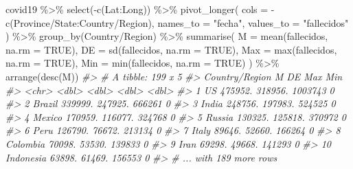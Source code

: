 \documentclass[
]{book}
\newenvironment{Shaded}{\begin{snugshade}}{\end{snugshade}}
\newcommand{\AttributeTok}[1]{\textcolor[rgb]{0.77,0.63,0.00}{#1}}
\newcommand{\CommentTok}[1]{\textcolor[rgb]{0.56,0.35,0.01}{\textit{#1}}}
\newcommand{\ConstantTok}[1]{\textcolor[rgb]{0.00,0.00,0.00}{#1}}
\newcommand{\FunctionTok}[1]{\textcolor[rgb]{0.00,0.00,0.00}{#1}}
\newcommand{\NormalTok}[1]{#1}
\newcommand{\SpecialCharTok}[1]{\textcolor[rgb]{0.00,0.00,0.00}{#1}}
\newcommand{\StringTok}[1]{\textcolor[rgb]{0.31,0.60,0.02}{#1}}
\begin{document}
\begin{Shaded}
\begin{Highlighting}[]
\NormalTok{covid19 }\SpecialCharTok{\%\textgreater{}\%}
  \FunctionTok{select}\NormalTok{(}\SpecialCharTok{{-}}\FunctionTok{c}\NormalTok{(Lat}\SpecialCharTok{:}\NormalTok{Long)) }\SpecialCharTok{\%\textgreater{}\%}
  \FunctionTok{pivot\_longer}\NormalTok{(}
    \AttributeTok{cols =} \SpecialCharTok{{-}}\FunctionTok{c}\NormalTok{(}\StringTok{\textasciigrave{}}\AttributeTok{Province/State}\StringTok{\textasciigrave{}}\SpecialCharTok{:}\StringTok{\textasciigrave{}}\AttributeTok{Country/Region}\StringTok{\textasciigrave{}}\NormalTok{),}
    \AttributeTok{names\_to =} \StringTok{"fecha"}\NormalTok{,}
    \AttributeTok{values\_to =} \StringTok{"fallecidos"}
\NormalTok{  ) }\SpecialCharTok{\%\textgreater{}\%}
  \FunctionTok{group\_by}\NormalTok{(}\StringTok{\textasciigrave{}}\AttributeTok{Country/Region}\StringTok{\textasciigrave{}}\NormalTok{) }\SpecialCharTok{\%\textgreater{}\%}
  \FunctionTok{summarise}\NormalTok{(}
    \AttributeTok{M =} \FunctionTok{mean}\NormalTok{(fallecidos, }\AttributeTok{na.rm =} \ConstantTok{TRUE}\NormalTok{),}
    \AttributeTok{DE =} \FunctionTok{sd}\NormalTok{(fallecidos, }\AttributeTok{na.rm =} \ConstantTok{TRUE}\NormalTok{),}
    \AttributeTok{Max =} \FunctionTok{max}\NormalTok{(fallecidos, }\AttributeTok{na.rm =} \ConstantTok{TRUE}\NormalTok{),}
    \AttributeTok{Min =} \FunctionTok{min}\NormalTok{(fallecidos, }\AttributeTok{na.rm =} \ConstantTok{TRUE}\NormalTok{)}
\NormalTok{  ) }\SpecialCharTok{\%\textgreater{}\%}
  \FunctionTok{arrange}\NormalTok{(}\FunctionTok{desc}\NormalTok{(M))}
\CommentTok{\#\textgreater{} \# A tibble: 199 x 5}
\CommentTok{\#\textgreater{}    \textasciigrave{}Country/Region\textasciigrave{}       M      DE     Max   Min}
\CommentTok{\#\textgreater{}    \textless{}chr\textgreater{}              \textless{}dbl\textgreater{}   \textless{}dbl\textgreater{}   \textless{}dbl\textgreater{} \textless{}dbl\textgreater{}}
\CommentTok{\#\textgreater{}  1 US               475952. 318956. 1003743     0}
\CommentTok{\#\textgreater{}  2 Brazil           339999. 247925.  666261     0}
\CommentTok{\#\textgreater{}  3 India            248756. 197983.  524525     0}
\CommentTok{\#\textgreater{}  4 Mexico           170959. 116077.  324768     0}
\CommentTok{\#\textgreater{}  5 Russia           130325. 125818.  370972     0}
\CommentTok{\#\textgreater{}  6 Peru             126790.  76672.  213134     0}
\CommentTok{\#\textgreater{}  7 Italy             89646.  52660.  166264     0}
\CommentTok{\#\textgreater{}  8 Colombia          70098.  53530.  139833     0}
\CommentTok{\#\textgreater{}  9 Iran              69298.  49668.  141293     0}
\CommentTok{\#\textgreater{} 10 Indonesia         63898.  61469.  156553     0}
\CommentTok{\#\textgreater{} \# ... with 189 more rows}
\end{Highlighting}
\end{Shaded}
\end{document}

